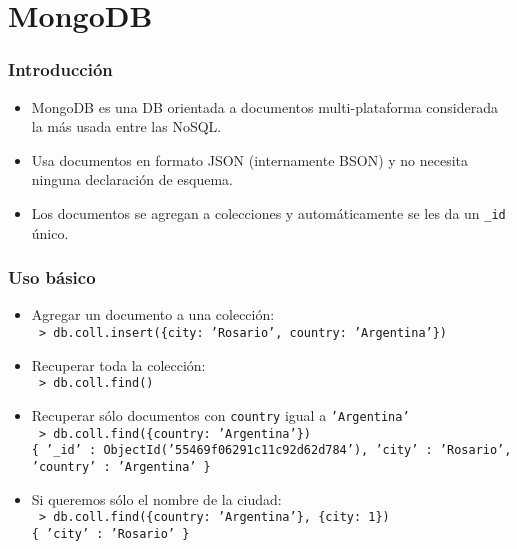 \section{MongoDB}

\begin{frame}
\frametitle{Introducción}
\begin{itemize}

\item	MongoDB es una DB orientada a documentos multi-plataforma
	considerada la más usada entre las NoSQL.
	\pause

\item	Usa documentos en formato JSON (internamente BSON) y no necesita
	ninguna declaración de esquema.
	\pause

\item	Los documentos se agregan a colecciones y automáticamente se les
	da un \texttt{\_id} único.
\end{itemize}
\end{frame}

\begin{frame}
\frametitle{Uso básico}
\begin{itemize}

\item	Agregar un documento a una colección: \\
	\texttt{\footnotesize
		> db.coll.insert(\{city: 'Rosario', country: 'Argentina'\})
	}
	\pause

\item	Recuperar toda la colección: \\
	\texttt{\footnotesize
		> db.coll.find()
	}
	\pause

\item	Recuperar sólo documentos con \texttt{country} igual a
	\texttt{'Argentina'} \\
	\texttt{\footnotesize
		> db.coll.find(\{country: 'Argentina'\}) \\
		\{ '\_id' : ObjectId('55469f06291c11c92d62d784'), 'city' : 'Rosario', 'country' : 'Argentina' \}
	}
	\pause

\item	Si queremos sólo el nombre de la ciudad: \\
	\texttt{\footnotesize
		> db.coll.find(\{country: 'Argentina'\}, \{city: 1\}) \\
		\{ 'city' : 'Rosario' \}
	}

\end{itemize}
\end{frame}
